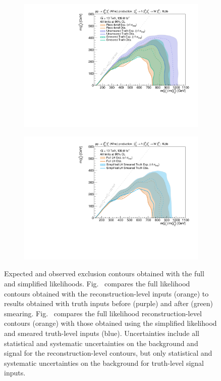  \begin{figure}
	\centering
	\begin{subfigure}[b]{0.49\linewidth}
		\centering\includegraphics[width=\textwidth]{exclusion_1Lbb_truthInput_compareReco_BkgOnly_noLabel}
		\caption{\label{fig:full_truth_result}}
	\end{subfigure}\hfill
	\begin{subfigure}[b]{0.49\linewidth}
		\centering\includegraphics[width=\textwidth]{exclusion_1Lbb_truthInput_BkgSignal_700_200_noLabel}
		\caption{\label{fig:simplified_truth_result}}
	\end{subfigure}\hfill
	\caption{Expected and observed exclusion contours obtained with the full and simplified likelihoods. Fig.~ compares the full likelihood contours obtained with the reconstruction-level inputs (orange) to results obtained with truth inputs before (purple) and after (green) smearing. Fig.~ compares the full likelihood reconstruction-level contours (orange) with those obtained using the simplified likelihood and smeared truth-level inputs (blue). Uncertainties include all statistical and systematic uncertainties on the background and signal for the reconstruction-level contours, but only statistical and systematic uncertainties on the background for truth-level signal inputs.}
	\label{fig:smearing_signal_regions}
\end{figure}

